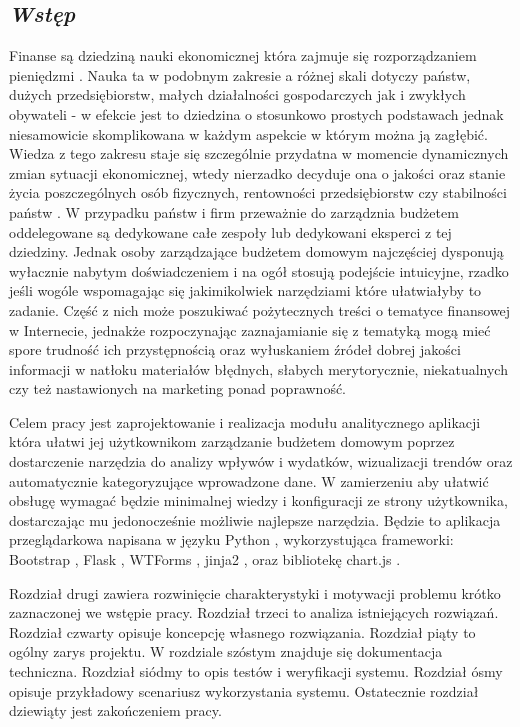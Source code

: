 \documentclass[a4paper,10pt, twoside]{report}
\newcommand{\customstylechapter}[1]{\large{\textit{#1}}}
\begin{document}
\begin{large}
\chapter{\customstylechapter{Wstęp}}
{Finanse są dziedziną nauki ekonomicznej która zajmuje się rozporządzaniem 
pieniędzmi  \cite{wiki_ekonomia}. Nauka ta w podobnym zakresie a różnej skali 
dotyczy państw, dużych przedsiębiorstw, małych działalności gospodarczych jak i 
zwykłych obywateli - w efekcie jest to dziedzina o stosunkowo prostych 
podstawach jednak niesamowicie skomplikowana w każdym aspekcie w którym można ją
 zagłębić. Wiedza z tego zakresu staje się szczególnie przydatna w momencie 
dynamicznych zmian sytuacji ekonomicznej, wtedy nierzadko decyduje ona o jakości
 oraz stanie życia poszczególnych osób fizycznych, rentowności przedsiębiorstw 
czy stabilności państw \cite{zapaśćekonomiczna}. W przypadku państw i firm 
przeważnie do zarządznia budżetem oddelegowane są dedykowane całe zespoły lub 
dedykowani eksperci z tej dziedziny. Jednak osoby zarządzające budżetem domowym 
najczęściej dysponują wyłacznie nabytym doświadczeniem i na ogół stosują 
podejście intuicyjne, rzadko jeśli wogóle wspomagając się jakimikolwiek 
narzędziami które ułatwiałyby to zadanie. Część z nich może poszukiwać 
pożytecznych treści o tematyce finansowej w Internecie, jednakże rozpoczynając 
zaznajamianie się z tematyką mogą mieć spore trudność ich przystępnością oraz 
wyłuskaniem źródeł dobrej jakości informacji w natłoku materiałów błędnych, 
słabych merytorycznie, niekatualnych czy też nastawionych na marketing ponad 
poprawność.}

\medskip
{Celem pracy jest zaprojektowanie i realizacja modułu analitycznego aplikacji 
która ułatwi jej użytkownikom zarządzanie budżetem domowym poprzez dostarczenie 
narzędzia do analizy wpływów i wydatków, wizualizacji trendów oraz automatycznie 
kategoryzujące wprowadzone dane. W zamierzeniu aby ułatwić obsługę wymagać 
będzie minimalnej wiedzy i konfiguracji ze strony użytkownika, dostarczając mu 
jedonocześnie możliwie najlepsze narzędzia. Będzie to aplikacja przeglądarkowa napisana w 
języku Python \cite{Python}\cite{pythonautomate}, wykorzystująca frameworki: 
Bootstrap \cite{Bootstrap}, Flask \cite{Flask}, WTForms \cite{WTForms}, jinja2 
\cite{jinja}, oraz bibliotekę chart.js \cite{chart.js}.}

\medskip
{Rozdział drugi zawiera rozwinięcie charakterystyki i motywacji problemu krótko 
zaznaczonej we wstępie pracy. Rozdział trzeci to analiza istniejących rozwiązań.
 Rozdział czwarty opisuje koncepcję własnego rozwiązania. Rozdział piąty to 
ogólny zarys projektu. W rozdziale szóstym znajduje się dokumentacja techniczna.
Rozdział siódmy to opis testów i weryfikacji systemu. Rozdział ósmy opisuje 
przykładowy scenariusz wykorzystania systemu. Ostatecznie rozdział dziewiąty 
jest zakończeniem pracy.}


\end{large}
\end{document}
